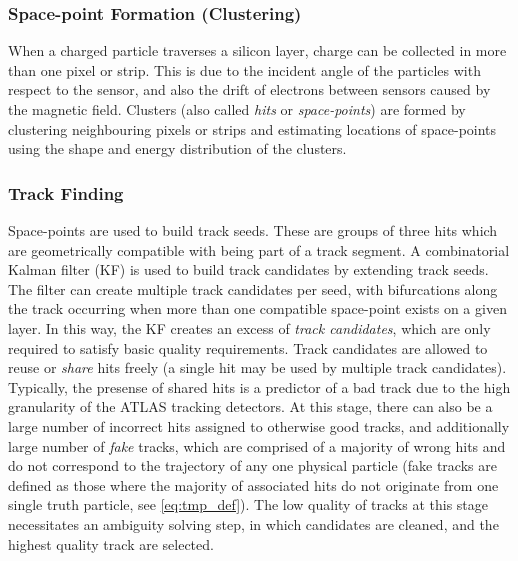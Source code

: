 
\subsubsection{Space-point Formation (Clustering)}
When a charged particle traverses a silicon layer, charge can be collected in more than one pixel or strip.
This is due to the incident angle of the particles with respect to the sensor, and also the drift of electrons between sensors caused by the magnetic field.
Clusters (also called \textit{hits} or \textit{space-points}) are formed by clustering neighbouring pixels or strips and estimating locations of space-points using the shape and energy distribution of the clusters.

\subsubsection{Track Finding}
Space-points are used to build track seeds. These are groups of three hits which are geometrically compatible with being part of a track segment.
A combinatorial Kalman filter (KF) is used to build track candidates by extending track seeds.
The filter can create multiple track candidates per seed, with bifurcations along the track occurring when more than one compatible space-point exists on a given layer.
In this way, the KF creates an excess of \textit{track candidates}, which are only required to satisfy basic quality requirements. 
Track candidates are allowed to reuse or \textit{share} hits freely (a single hit may be used by multiple track candidates).
Typically, the presense of shared hits is a predictor of a bad track due to the high granularity of the ATLAS tracking detectors.
At this stage, there can also be a large number of incorrect hits assigned to otherwise good tracks, and additionally large number of \textit{fake} tracks, which are comprised of a majority of wrong hits and do not correspond to the trajectory of any one physical particle (fake tracks are defined as those where the majority of associated hits do not originate from one single truth particle, see \cref{eq:tmp_def}).
The low quality of tracks at this stage necessitates an ambiguity solving step, in which candidates are cleaned, and the highest quality track are selected.


